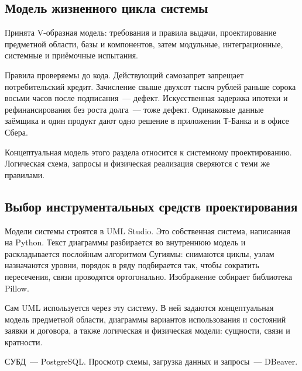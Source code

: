 \documentclass[14pt,a4paper]{extarticle}
\begin{document}
\subsection{Модель жизненного цикла системы}

Принята V-образная модель: требования и правила выдачи, проектирование предметной области, базы и компонентов, затем модульные, интеграционные, системные и приёмочные испытания.

Правила проверяемы до кода. Действующий самозапрет запрещает потребительский кредит. Зачисление свыше двухсот тысяч рублей раньше сорока восьми часов после подписания~--- дефект. Искусственная задержка ипотеки и рефинансирования без роста долга~--- тоже дефект. Одинаковые данные заёмщика и один продукт дают одно решение в приложении Т-Банка и в офисе Сбера.

Концептуальная модель этого раздела относится к системному проектированию. Логическая схема, запросы и физическая реализация сверяются с теми же правилами.

\subsection{Выбор инструментальных средств проектирования}

Модели системы строятся в UML Studio. Это собственная система, написанная на Python. Текст диаграммы разбирается во внутреннюю модель и раскладывается послойным алгоритмом Сугиямы: снимаются циклы, узлам назначаются уровни, порядок в ряду подбирается так, чтобы сократить пересечения, связи проводятся ортогонально. Изображение собирает библиотека Pillow.

Сам UML используется через эту систему. В ней задаются концептуальная модель предметной области, диаграммы вариантов использования и состояний заявки и договора, а также логическая и физическая модели: сущности, связи и кратности.

СУБД~--- PostgreSQL. Просмотр схемы, загрузка данных и запросы~--- DBeaver.
\end{document}
